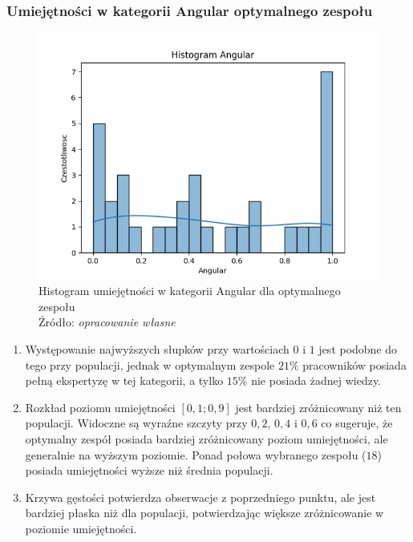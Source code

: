         \subsubsection{Umiejętności w kategorii Angular optymalnego zespołu}
        \begin{figure}[H]
            \centering
            \includegraphics[width=\linewidth]{chapters/Images/hist_angular_optimal.png}
            \cprotect\caption{Histogram umiejętności w kategorii Angular dla optymalnego zespołu\\ Źródło:\textit{ opracowanie własne}}
            \label{fig:hist_angular_optimal}
        \end{figure}

        \begin{enumerate}
            \item Występowanie najwyższych słupków przy wartościach $0$ i $1$ jest podobne do tego przy populacji, jednak w optymalnym zespole $21\%$ pracowników posiada pełną ekspertyzę w tej kategorii, a tylko $15\%$ nie posiada żadnej wiedzy.
            \item Rozkład poziomu umiejętności $[0,1; 0,9]$ jest bardziej zróżnicowany niż ten populacji. Widoczne są wyraźne szczyty przy $0,2$, $0,4$ i $0,6$ co sugeruje, że optymalny zespół posiada bardziej zróżnicowany poziom umiejętności, ale generalnie na wyższym poziomie. Ponad połowa wybranego zespołu ($18$) posiada umiejętności wyższe niż średnia populacji.
            \item Krzywa gęstości potwierdza obserwacje z poprzedniego punktu, ale jest bardziej płaska niż dla populacji, potwierdzając większe zróżnicowanie w poziomie umiejętności.
        \end{enumerate}
        
